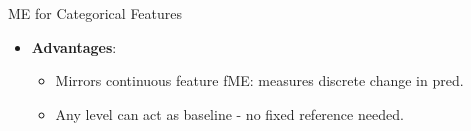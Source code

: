 \documentclass[10pt,compress,t,notes=noshow, xcolor=table]{beamer}
\begin{document}
\begin{frame}{ME for Categorical Features}
\begin{itemize}
\item \textbf{Advantages}:
\begin{itemize}
\item Mirrors continuous feature fME: measures discrete change in pred.
\item Any level can act as baseline - no fixed reference needed.
\end{itemize}
\end{itemize}
\end{frame}





\end{document}
